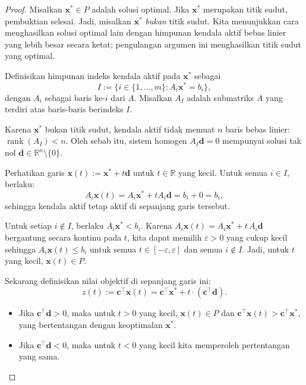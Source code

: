 \begin{proof}
Misalkan \( \mathbf{x}^* \in P \) adalah solusi optimal. Jika \( \mathbf{x}^* \) merupakan titik sudut, pembuktian selesai. Jadi, misalkan \( \mathbf{x}^* \) \emph{bukan} titik sudut. Kita menunjukkan cara menghasilkan solusi optimal lain dengan himpunan kendala aktif bebas linier yang lebih besar secara ketat; pengulangan argumen ini menghasilkan titik sudut yang optimal.

Definisikan himpunan indeks kendala aktif pada \( \mathbf{x}^* \) sebagai
\[
I := \{ i \in \{1, \dots, m\} : A_i \mathbf{x}^* = b_i \},
\]
dengan \( A_i \) sebagai baris ke-$i$ dari \( A \). Misalkan \( A_I \) adalah submatriks \( A \) yang terdiri atas baris-baris berindeks \( I \).

Karena \( \mathbf{x}^* \) bukan titik sudut, kendala aktif tidak memuat \( n \) baris bebas linier: \( \operatorname{rank}(A_I) < n \). Oleh sebab itu, sistem homogen \( A_I \mathbf{d} = 0 \) mempunyai solusi tak nol \( \mathbf{d} \in \mathbb{R}^n \setminus \{0\} \).

Perhatikan garis \( \mathbf{x}(t) := \mathbf{x}^* + t \mathbf{d} \) untuk \( t \in \mathbb{R} \) yang kecil. Untuk semua \( i \in I \), berlaku:
\[
A_i \mathbf{x}(t) = A_i \mathbf{x}^* + t A_i \mathbf{d} = b_i + 0 = b_i,
\]
sehingga kendala aktif tetap aktif di sepanjang garis tersebut.

Untuk setiap \( i \notin I \), berlaku \( A_i \mathbf{x}^* < b_i \). Karena \( A_i \mathbf{x}(t) = A_i \mathbf{x}^* + t \, A_i \mathbf{d} \) bergantung secara kontinu pada \( t \), kita dapat memilih \( \varepsilon > 0 \) yang cukup kecil sehingga \( A_i \mathbf{x}(t) \leq b_i \) untuk semua \( t \in [-\varepsilon, \varepsilon] \) dan semua \( i \notin I \). Jadi, untuk \( t \) yang kecil, \( \mathbf{x}(t) \in P \).

Sekarang definisikan nilai objektif di sepanjang garis ini: 
\[
z(t) := \mathbf{c}^\top \mathbf{x}(t) = \mathbf{c}^\top \mathbf{x}^* + t \cdot (\mathbf{c}^\top \mathbf{d}).
\]

\begin{itemize}
\item Jika \( \mathbf{c}^\top \mathbf{d} > 0 \), maka untuk \( t > 0 \) yang kecil, \( \mathbf{x}(t) \in P \) dan \( \mathbf{c}^\top \mathbf{x}(t) > \mathbf{c}^\top \mathbf{x}^* \), yang bertentangan dengan keoptimalan \( \mathbf{x}^* \).
\item Jika \( \mathbf{c}^\top \mathbf{d} < 0 \), maka untuk \( t < 0 \) yang kecil kita memperoleh pertentangan yang sama.
\end{itemize}


\end{proof}
